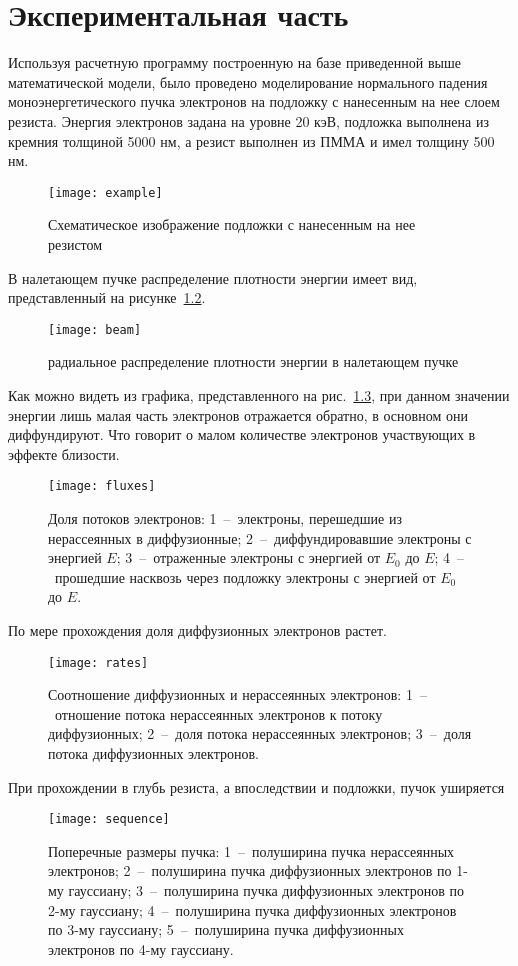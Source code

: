 \chapter{Экспериментальная часть}
Используя расчетную программу построенную на базе приведенной выше математической модели, было проведено моделирование нормального падения моноэнергетического пучка электронов на подложку с нанесенным на нее слоем резиста. Энергия электронов задана на уровне 20 кэВ, подложка выполнена из кремния толщиной 5000 нм, а резист выполнен из ПММА и имел толщину 500 нм.

\begin{figure}[h]
    \center
    \texttt{[image: example]}
    \caption{Схематическое изображение подложки с нанесенным на нее резистом}
    \label{fig:example}
\end{figure}
В налетающем пучке распределение плотности энергии имеет вид, представленный на рисунке~\ref{fig:beam}.
\begin{figure}[h]
    \center
    \texttt{[image: beam]}
    \caption{радиальное распределение плотности энергии в налетающем пучке}
    \label{fig:beam}
\end{figure}

Как можно видеть из графика, представленного на рис.~\ref{fig:fluxes}, при данном значении энергии лишь малая часть электронов отражается обратно, в основном они диффундируют. Что говорит о малом количестве электронов участвующих в эффекте близости.
\begin{figure}[h]
    \center
    \texttt{[image: fluxes]}
    \caption{Доля потоков электронов:
    1~--~электроны, перешедшие из нерассеянных в диффузионные;
2~--~диффундировавшие электроны с энергией $E$;
3~--~отраженные электроны с энергией от $E_0$ до $E$;
4~--~прошедшие насквозь через подложку электроны с энергией от $E_0$ до $E$.
}
    \label{fig:fluxes}
\end{figure}

По мере прохождения доля диффузионных электронов растет.
\begin{figure}[h]
    \center
    \texttt{[image: rates]}
    \caption{Соотношение диффузионных и нерассеянных электронов: 1~--~отношение потока нерассеянных электронов к потоку диффузионных;
2~--~доля потока нерассеянных электронов;
3~--~доля потока диффузионных электронов.
}
    \label{fig:rates}
\end{figure}
При прохождении в глубь резиста, а впоследствии и подложки, пучок уширяется
\begin{figure}[h]
    \center
    \texttt{[image: sequence]}
    \caption{Поперечные размеры пучка:
1~--~полуширина пучка нерассеянных электронов;
2~--~полуширина пучка диффузионных электронов по 1-му гауссиану;
3~--~полуширина пучка диффузионных электронов по 2-му гауссиану;
4~--~полуширина пучка диффузионных электронов по 3-му гауссиану;
5~--~полуширина пучка диффузионных электронов по 4-му гауссиану.}
    \label{fig:sequence}
\end{figure}

